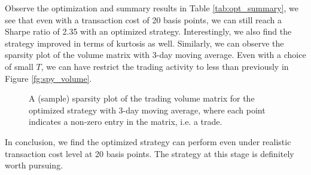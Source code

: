 \documentclass[11pt]{article}
\theoremstyle{definition}
\begin{document}
Observe the optimization and summary results 
in Table \ref{tab:opt_summary},
we see that even with a transaction cost of 20 basis points,
we can still reach a Sharpe ratio of 2.35 
with an optimized strategy.
Interestingly, we also find the strategy 
improved in terms of kurtosis as well.
Similarly, we can observe the sparsity plot of 
the volume matrix with 3-day moving average.
Even with a choice of small $T$, 
we can have restrict the trading activity to 
less than previously in Figure \ref{fg:spy_volume}.

\begin{figure}[h]
\begin{center}
\end{center}
\centering
\caption{\label{fg:spy_volume_opt}
A (sample) sparsity plot of the trading volume matrix
for the optimized strategy with 3-day moving average,
where each point indicates a non-zero entry
in the matrix, i.e. a trade.
}
\end{figure}

In conclusion, we find the optimized strategy 
can perform even under realistic transaction cost
level at 20 basis points.
The strategy at this stage is definitely 
worth pursuing.
\end{document}
